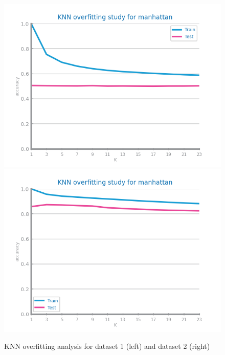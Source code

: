 \documentclass[10pt]{extarticle}
\begin{document}
\begin{figure}[H]
\centering\includegraphics[scale=0.95]{images/dataset1/models_evaluation/CovidPos_knn_overfitting.png}
\includegraphics[scale=0.95]{images/dataset2/models_evaluation/Credit_Score_knn_overfitting.png}
\caption{KNN overfitting analysis for dataset 1 (left) and dataset 2 (right)}
\end{figure}
\end{document}
